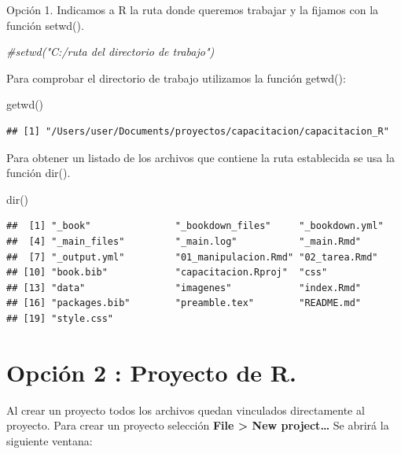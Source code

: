 \documentclass[
]{book}
\newenvironment{Shaded}{\begin{snugshade}}{\end{snugshade}}
\newcommand{\CommentTok}[1]{\textcolor[rgb]{0.56,0.35,0.01}{\textit{#1}}}
\newcommand{\FunctionTok}[1]{\textcolor[rgb]{0.00,0.00,0.00}{#1}}
\newcommand{\NormalTok}[1]{#1}
\begin{document}
Opción 1. Indicamos a R la ruta donde queremos trabajar y la fijamos con la función setwd().

\begin{Shaded}
\begin{Highlighting}[]
\CommentTok{\#setwd("C:/ruta del directorio de trabajo")}
\end{Highlighting}
\end{Shaded}

Para comprobar el directorio de trabajo utilizamos la función getwd():

\begin{Shaded}
\begin{Highlighting}[]
\FunctionTok{getwd}\NormalTok{()}
\end{Highlighting}
\end{Shaded}

\begin{verbatim}
## [1] "/Users/user/Documents/proyectos/capacitacion/capacitacion_R"
\end{verbatim}

Para obtener un listado de los archivos que contiene la ruta establecida se usa la función dir().

\begin{Shaded}
\begin{Highlighting}[]
\FunctionTok{dir}\NormalTok{()}
\end{Highlighting}
\end{Shaded}

\begin{verbatim}
##  [1] "_book"               "_bookdown_files"     "_bookdown.yml"      
##  [4] "_main_files"         "_main.log"           "_main.Rmd"          
##  [7] "_output.yml"         "01_manipulacion.Rmd" "02_tarea.Rmd"       
## [10] "book.bib"            "capacitacion.Rproj"  "css"                
## [13] "data"                "imagenes"            "index.Rmd"          
## [16] "packages.bib"        "preamble.tex"        "README.md"          
## [19] "style.css"
\end{verbatim}

\hypertarget{opciuxf3n-2-proyecto-de-r.}{%
\section{Opción 2 : Proyecto de R.}\label{opciuxf3n-2-proyecto-de-r.}}

Al crear un proyecto todos los archivos quedan vinculados directamente al proyecto. Para crear un proyecto selección \textbf{File \textgreater{} New project\ldots{}} Se abrirá la siguiente ventana:
\end{document}
